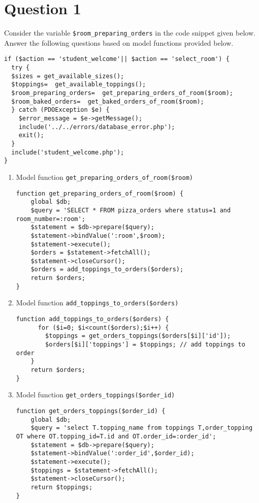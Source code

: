 
\section*{Question 1}

Consider the variable \texttt{\$room\_preparing\_orders} in the code snippet given below. Answer the following questions based on model functions provided below.

\lstset{language=php}
\begin{lstlisting}
if ($action == 'student_welcome'|| $action == 'select_room') {
  try {
  $sizes = get_available_sizes();
  $toppings=  get_available_toppings();
  $room_preparing_orders=  get_preparing_orders_of_room($room);
  $room_baked_orders=  get_baked_orders_of_room($room);
  } catch (PDOException $e) {
    $error_message = $e->getMessage(); 
    include('../../errors/database_error.php');
    exit();
  }
  include('student_welcome.php');
}
\end{lstlisting}

\begin{enumerate}
\item Model function \texttt{get\_preparing\_orders\_of\_room(\$room)}
\begin{lstlisting}
function get_preparing_orders_of_room($room) {
    global $db;
    $query = 'SELECT * FROM pizza_orders where status=1 and room_number=:room';
    $statement = $db->prepare($query);
    $statement->bindValue(':room',$room);
    $statement->execute();
    $orders = $statement->fetchAll();
    $statement->closeCursor(); 
    $orders = add_toppings_to_orders($orders);
    return $orders;
}
\end{lstlisting}
\item Model function \texttt{add\_toppings\_to\_orders(\$orders)}
\begin{lstlisting}
function add_toppings_to_orders($orders) {
      for ($i=0; $i<count($orders);$i++) {
        $toppings = get_orders_toppings($orders[$i]['id']);
        $orders[$i]['toppings'] = $toppings; // add toppings to order 
    } 
    return $orders;
}
\end{lstlisting}
\item Model function \texttt{get\_orders\_toppings(\$order\_id)}
\begin{lstlisting}
function get_orders_toppings($order_id) {
    global $db;
    $query = 'select T.topping_name from toppings T,order_topping OT where OT.topping_id=T.id and OT.order_id=:order_id';
    $statement = $db->prepare($query);
    $statement->bindValue(':order_id',$order_id);
    $statement->execute();
    $toppings = $statement->fetchAll();
    $statement->closeCursor();
    return $toppings;
}
\end{lstlisting}
\end{enumerate}

